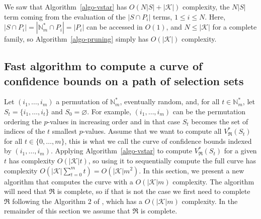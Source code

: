 \documentclass[
  11pt,
  a4paper,
]{article}
\theoremstyle{plain}
\theoremstyle{plain}
\theoremstyle{definition}
\theoremstyle{plain}
\theoremstyle{definition}
\theoremstyle{remark}
\newcounter{quartocallouttipno}
\newcommand{\quartocallouttip}[1]{\refstepcounter{quartocallouttipno}\label{#1}}
\begin{document}
\begin{tcolorbox}[enhanced jigsaw, left=2mm, coltitle=black, toptitle=1mm, colback=white, bottomtitle=1mm, breakable, title=\textcolor{quarto-callout-tip-color}{\faLightbulb}\hspace{0.5em}{Tip \ref*{tip-pruning-complexity}: Tip}, titlerule=0mm, arc=.35mm, opacityback=0, opacitybacktitle=0.6, colbacktitle=quarto-callout-tip-color!10!white, toprule=.15mm, bottomrule=.15mm, rightrule=.15mm, colframe=quarto-callout-tip-color-frame, leftrule=.75mm]

\quartocallouttip{tip-pruning-complexity} 

We saw that Algorithm~\ref{algo-vstar} has \(O(N|S|+|\mathcal{K}|)\)
complexity, the \(N|S|\) term coming from the evaluation of the
\(|S\cap P_i|\) terms, \(1\leq i\leq N\). Here,
\(|S\cap P_i|=|\mathbb{N}_m^*\cap P_i|=|P_i|\) can be accessed in
\(O(1)\), and \(N\leq |\mathcal{K}|\) for a complete family, so
Algorithm~\ref{algo-pruning} simply has \(O(|\mathcal{K}|)\) complexity.

\end{tcolorbox}

\subsection{Fast algorithm to compute a curve of confidence bounds on a
path of selection sets}\label{sec-fast-curve}

Let \((i_1,\dotsc, i_m)\) a permutation of \(\mathbb{N}_m^*\),
eventually random, and, for all \(t\in\mathbb{N}_m^*\), let
\(S_t=\{i_1,\dotsc,i_t\}\) and \(S_0=\varnothing\). For example,
\((i_1,\dotsc, i_m)\) can be the permutation ordering the \(p\)-values
in increasing order and in that case \(S_t\) becomes the set of indices
of the \(t\) smallest \(p\)-values. Assume that we want to compute all
\(V^*_{\mathfrak{R}}(S_t)\) for all \(t\in\{ 0,\dotsc,m\}\), this is
what we call the curve of confidence bounds indexed by
\((i_1,\dotsc, i_m).\) Applying Algorithm~\ref{algo-vstar} to compute
\(V^*_{\mathfrak{R}}(S_t)\) for a given \(t\) has complexity
\(O(|\mathcal{K}|t)\), so using it to sequentially compute the full
curve has complexity
\(O\left(  |\mathcal{K}|\sum_{t=0}^m t\right)=O\left(|\mathcal{K}|m^2\right)\).
In this section, we present a new algorithm that computes the curve with
a \(O\left(|\mathcal{K}|m\right)\) complexity. The algorithm will need
that \(\mathfrak{R}\) is complete, so if that is not the case we first
need to complete \(\mathfrak{R}\) following the Algorithm 2 of
\citet{MR4178188}, which has a \(O(|\mathcal{K}|m)\) complexity. In the
remainder of this section we assume that \(\mathfrak{R}\) is complete.
\end{document}
